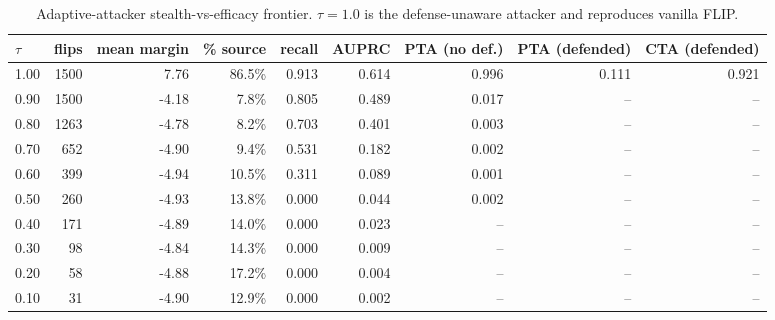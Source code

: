 \begin{table}[t]
\centering
\small
\begin{tabular}{lrrrrrrrr}
\toprule
$\tau$ & flips & mean margin & \% source & recall & AUPRC & PTA (no def.) & PTA (defended) & CTA (defended) \\
\midrule
1.00 & 1500 & 7.76 & 86.5\% & 0.913 & 0.614 & 0.996 & 0.111 & 0.921 \\
0.90 & 1500 & -4.18 & 7.8\% & 0.805 & 0.489 & 0.017 & -- & -- \\
0.80 & 1263 & -4.78 & 8.2\% & 0.703 & 0.401 & 0.003 & -- & -- \\
0.70 & 652 & -4.90 & 9.4\% & 0.531 & 0.182 & 0.002 & -- & -- \\
0.60 & 399 & -4.94 & 10.5\% & 0.311 & 0.089 & 0.001 & -- & -- \\
0.50 & 260 & -4.93 & 13.8\% & 0.000 & 0.044 & 0.002 & -- & -- \\
0.40 & 171 & -4.89 & 14.0\% & 0.000 & 0.023 & -- & -- & -- \\
0.30 & 98 & -4.84 & 14.3\% & 0.000 & 0.009 & -- & -- & -- \\
0.20 & 58 & -4.88 & 17.2\% & 0.000 & 0.004 & -- & -- & -- \\
0.10 & 31 & -4.90 & 12.9\% & 0.000 & 0.002 & -- & -- & -- \\
\bottomrule
\end{tabular}
\caption{Adaptive-attacker stealth-vs-efficacy frontier. $\tau=1.0$ is the defense-unaware attacker and reproduces vanilla FLIP.}
\label{tab:frontier}
\end{table}
